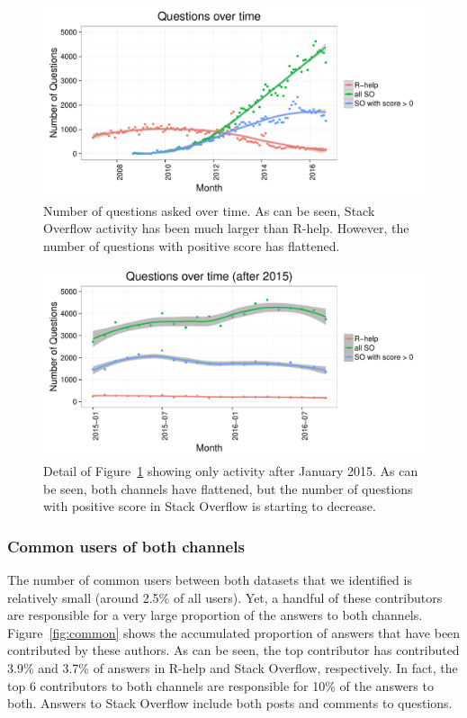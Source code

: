 \documentclass[smallextended]{svjour3}       %
\newcommand{\SO}{Stack Overflow\xspace}
\newcommand{\RH}{R-help\xspace}
\begin{document}
\begin{figure}[htbp]
  \centering
  \includegraphics[width=.95\textwidth]{figs/actByMonth.pdf}
  \caption{Number of questions asked over time. As can be seen, \SO activity has been much larger than \RH. However,
    the number of questions with positive score has flattened.}
  \label{fig:channelsActPerMonth}
\end{figure}


\begin{figure}[htbp]
  \centering
  \includegraphics[width=.95\textwidth]{figs/actByMonth2016.pdf}
  \caption{Detail of Figure~\ref{fig:channelsActPerMonth} showing only activity after January 2015. As can be seen, both
    channels have flattened, but the number of questions with positive score in \SO is starting to decrease.}
  \label{fig:channelsActPerMonthLatests}
\end{figure}

\subsubsection{Common users of both channels}

The number of common users between both datasets that we identified is relatively small (around 2.5\% of all
users). Yet, a handful of these contributors are responsible for a very large proportion of the answers to both
channels. Figure~\ref{fig:common} shows the accumulated proportion of answers that have been contributed by these
authors. As can be seen, the top contributor has contributed 3.9\% and 3.7\% of answers in \RH and \SO,
respectively. In fact, the top 6 contributors to both channels are responsible for 10\% of the answers to both. 
Answers to \SO include both posts and comments to questions.
\end{document}
